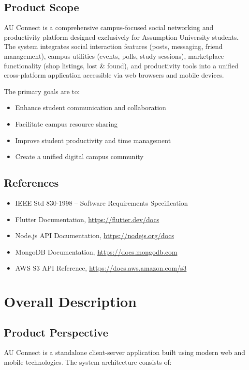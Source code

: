 \documentclass[12pt,a4paper]{article}
\begin{document}
\subsection{Product Scope}
AU Connect is a comprehensive campus-focused social networking and productivity platform designed exclusively for Assumption University students. The system integrates social interaction features (posts, messaging, friend management), campus utilities (events, polls, study sessions), marketplace functionality (shop listings, lost \& found), and productivity tools into a unified cross-platform application accessible via web browsers and mobile devices.

The primary goals are to:
\begin{itemize}
    \item Enhance student communication and collaboration
    \item Facilitate campus resource sharing
    \item Improve student productivity and time management
    \item Create a unified digital campus community
\end{itemize}

\subsection{References}
\begin{itemize}
    \item IEEE Std 830-1998 – Software Requirements Specification
    \item Flutter Documentation, \url{https://flutter.dev/docs}
    \item Node.js API Documentation, \url{https://nodejs.org/docs}
    \item MongoDB Documentation, \url{https://docs.mongodb.com}
    \item AWS S3 API Reference, \url{https://docs.aws.amazon.com/s3}
\end{itemize}

\section{Overall Description}

\subsection{Product Perspective}
AU Connect is a standalone client-server application built using modern web and mobile technologies. The system architecture consists of:
\end{document}
